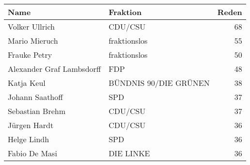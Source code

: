 
\begin{tabular}{llr}
\toprule
Name & Fraktion & Reden\\
\midrule
Volker Ullrich & CDU/CSU & 68\\
Mario Mieruch & fraktionslos & 55\\
Frauke Petry & fraktionslos & 50\\
Alexander Graf Lambsdorff & FDP & 48\\
Katja Keul & BÜNDNIS 90/DIE GRÜNEN & 38\\
Johann Saathoff & SPD & 37\\
Sebastian Brehm & CDU/CSU & 37\\
Jürgen Hardt & CDU/CSU & 36\\
Helge Lindh & SPD & 36\\
Fabio De Masi & DIE LINKE & 36\\
\bottomrule
\end{tabular}